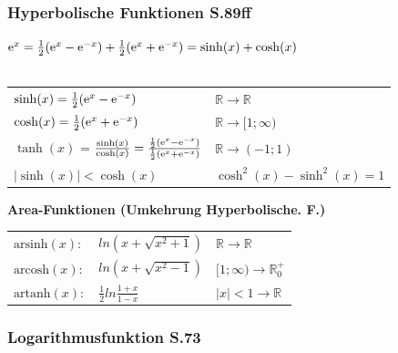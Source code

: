 		\subsubsection{Hyperbolische Funktionen S.89ff}
			$\mathrm{e}^x = \frac{1}{2} (\mathrm{e}^x - \mathrm{e}^{-x}) + \frac{1}{2} (\mathrm{e}^x + \mathrm{e}^{-x}) = \sinh(x) + \cosh(x)$ \\
			\\
			\begin{tabular}{ll}
				$\sinh(x) = \frac{1}{2} (\mathrm{e}^x - \mathrm{e}^{-x})$ & $\mathbb{R} \rightarrow \mathbb{R}$ \\
				$\cosh(x) = \frac{1}{2} (\mathrm{e}^x + \mathrm{e}^{-x})$ & $\mathbb{R} \rightarrow [1; \infty)$ \\
				$\tanh(x)$ = $\frac{\sinh(x)}{\cosh(x)} = \frac{\frac{1}{2} (\mathrm{e}^x - \mathrm{e}^{-x})}{\frac{1}{2} (\mathrm{e}^x + \mathrm{e}^{-x})}$ & $\mathbb{R} \rightarrow (-1; 1)$ \\	
				$\vert \sinh(x) \vert < \cosh(x)$	& $\cosh^2(x) - \sinh^2(x) = 1$\\
			\end{tabular}
			
			\textbf{Area-Funktionen (Umkehrung Hyperbolische. F.)} \\
				\begin{tabular}{lll}
					$\mathrm{arsinh}(x): $ & $ln(x + \sqrt{x^2+1})$         & $\mathbb{R} \rightarrow \mathbb{R}$ \\
					$\mathrm{arcosh}(x): $ & $ln(x + \sqrt{x^2-1})$         & $[1; \infty) \rightarrow \mathbb{R}^+_0$  \\
					$\mathrm{artanh}(x): $ & $\frac{1}{2}ln\frac{1+x}{1-x}$ & $ \vert x \vert < 1 \rightarrow \mathbb{R} $ \\			
				\end{tabular}
			
		\subsubsection{Logarithmusfunktion S.73}
				
